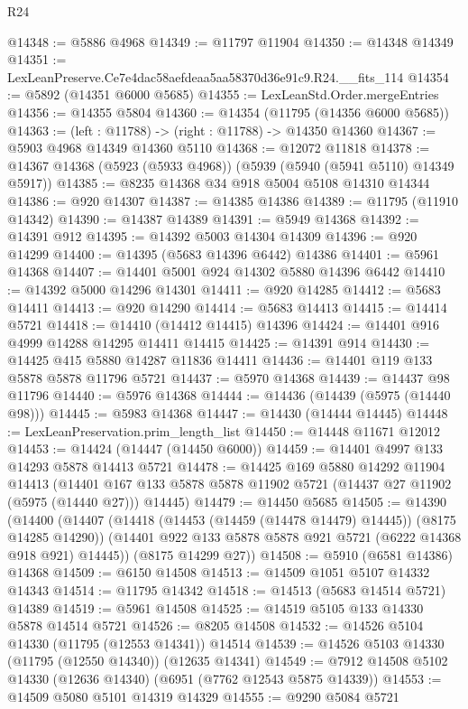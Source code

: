 \begin{lexlean}{R24}
\begin{coremodule}
@14348 := @5886 @4968
@14349 := @11797 @11904
@14350 := @14348 @14349
@14351 := LexLeanPreserve.Ce7e4dac58aefdeaa5aa58370d36e91c9.R24.__fits_114
@14354 := @5892 (@14351 @6000 @5685)
@14355 := LexLeanStd.Order.mergeEntries
@14356 := @14355 @5804
@14360 := @14354 (@11795 (@14356 @6000 @5685))
@14363 := (left : @11788) -> (right : @11788) -> @14350 @14360
@14367 := @5903 @4968 @14349 @14360 @5110
@14368 := @12072 @11818
@14378 := @14367 @14368 (@5923 (@5933 @4968)) (@5939 (@5940 (@5941 @5110) @14349 @5917))
@14385 := @8235 @14368 @34 @918 @5004 @5108 @14310 @14344
@14386 := @920 @14307
@14387 := @14385 @14386
@14389 := @11795 (@11910 @14342)
@14390 := @14387 @14389
@14391 := @5949 @14368
@14392 := @14391 @912
@14395 := @14392 @5003 @14304 @14309
@14396 := @920 @14299
@14400 := @14395 (@5683 @14396 @6442) @14386
@14401 := @5961 @14368
@14407 := @14401 @5001 @924 @14302 @5880 @14396 @6442
@14410 := @14392 @5000 @14296 @14301
@14411 := @920 @14285
@14412 := @5683 @14411
@14413 := @920 @14290
@14414 := @5683 @14413
@14415 := @14414 @5721
@14418 := @14410 (@14412 @14415) @14396
@14424 := @14401 @916 @4999 @14288 @14295 @14411 @14415
@14425 := @14391 @914
@14430 := @14425 @415 @5880 @14287 @11836 @14411
@14436 := @14401 @119 @133 @5878 @5878 @11796 @5721
@14437 := @5970 @14368
@14439 := @14437 @98 @11796
@14440 := @5976 @14368
@14444 := @14436 (@14439 (@5975 (@14440 @98)))
@14445 := @5983 @14368
@14447 := @14430 (@14444 @14445)
@14448 := LexLeanPreservation.prim_length_list
@14450 := @14448 @11671 @12012
@14453 := @14424 (@14447 (@14450 @6000))
@14459 := @14401 @4997 @133 @14293 @5878 @14413 @5721
@14478 := @14425
    @169
    @5880
    @14292
    @11904
    @14413
    (@14401 @167 @133 @5878 @5878 @11902 @5721 (@14437 @27 @11902 (@5975 (@14440 @27))) @14445)
@14479 := @14450 @5685
@14505 := @14390
    (@14400
      (@14407
        (@14418 (@14453 (@14459 (@14478 @14479) @14445)) (@8175 @14285 @14290))
        (@14401 @922 @133 @5878 @5878 @921 @5721 (@6222 @14368 @918 @921) @14445))
      (@8175 @14299 @27))
@14508 := @5910 (@6581 @14386) @14368
@14509 := @6150 @14508
@14513 := @14509 @1051 @5107 @14332 @14343
@14514 := @11795 @14342
@14518 := @14513 (@5683 @14514 @5721) @14389
@14519 := @5961 @14508
@14525 := @14519 @5105 @133 @14330 @5878 @14514 @5721
@14526 := @8205 @14508
@14532 := @14526 @5104 @14330 (@11795 (@12553 @14341)) @14514
@14539 := @14526 @5103 @14330 (@11795 (@12550 @14340)) (@12635 @14341)
@14549 := @7912 @14508 @5102 @14330 (@12636 @14340) (@6951 (@7762 @12543 @5875 @14339))
@14553 := @14509 @5080 @5101 @14319 @14329
@14555 := @9290 @5084 @5721

\end{coremodule}
\end{lexlean}
